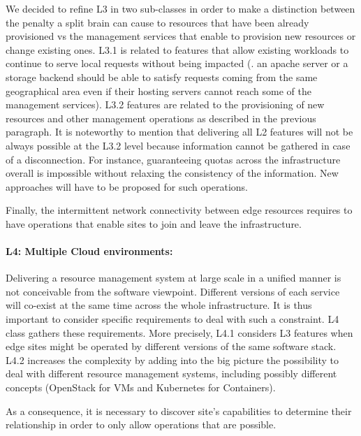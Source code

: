 We decided to refine L3 in two sub-classes in order to make a
distinction between the penalty a split brain can cause to resources
that have been already provisioned vs the management services that
enable to provision new resources or change existing ones. L3.1 is
related to features that allow existing workloads to continue to serve
local requests without being impacted (\eg. an apache server or a
storage backend should be able to satisfy requests coming from the
same geographical area even if their hosting servers cannot reach some
of the management services). L3.2 features are related to the
provisioning of new resources and other management operations as
described in the previous paragraph.
%
It is noteworthy to mention that delivering all L2
features will not be always possible at the L3.2 level because information
cannot be gathered in case of a disconnection.  For instance,
guaranteeing quotas across the infrastructure overall is impossible
without relaxing the consistency of the information. New approaches
will have to be proposed for such operations.

Finally, the intermittent network connectivity between edge resources
requires to have operations that enable sites to join and leave the
infrastructure.


\paragraph{L4: Multiple Cloud environments:}
Delivering a resource management system at large scale in a unified
manner is not conceivable from the software viewpoint.  Different
versions of each service will co-exist at the same time across the
whole infrastructure.  It is thus important to consider specific
requirements to deal with such a constraint.  L4 class gathers these
requirements.
%
More precisely, L4.1 considers L3 features when edge sites might be
operated by different versions of the same software stack.
%
L4.2 increases the complexity by adding into the big picture the
possibility to deal with different resource management systems,
including possibly different concepts (\eg OpenStack for VMs and
Kubernetes for Containers).

As a consequence, it is necessary to discover site's capabilities to
determine their relationship in order to only allow operations that are
possible.

